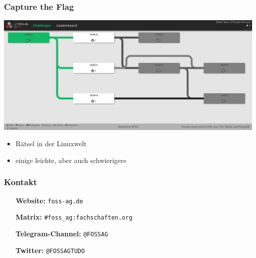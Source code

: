 \documentclass[12pt,utf8]{beamer}
\begin{document}
	\begin{frame}
		\frametitle{Capture the Flag}
		\includegraphics[width=\linewidth]{resources/screenshot_ctf.png}
		\begin{itemize}
			\item Rätsel in der Linuxwelt
			\item einige leichte, aber auch schwierigere
		\end{itemize}
	\end{frame}
	
	\begin{frame}
		\frametitle{Kontakt}

		
		\begin{itemize}[leftmargin=4cm]
			\item[\textbf{Website:}]\texttt{foss-ag.de}
			\item[\textbf{Matrix:}] \texttt{\#foss\_ag:fachschaften.org}
			\item[\textbf{Telegram-Channel:}] \texttt{@FOSSAG}
			\item[\textbf{Twitter:}] \texttt{@FOSSAGTUDO}	
			
		\end{itemize}
	\end{frame}
\end{document}
